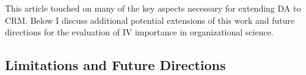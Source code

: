 \documentclass[ShortAfour,times,sageapa]{sagej}
\begin{document}
	This article touched on many of the key aspects necessary for extending DA to CRM.
	Below I discuss additional potential extensions of this work and future directions for the evaluation of IV importance in organizational science.
	
	\subsection{Limitations and Future Directions}
	
	
	
\end{document}
